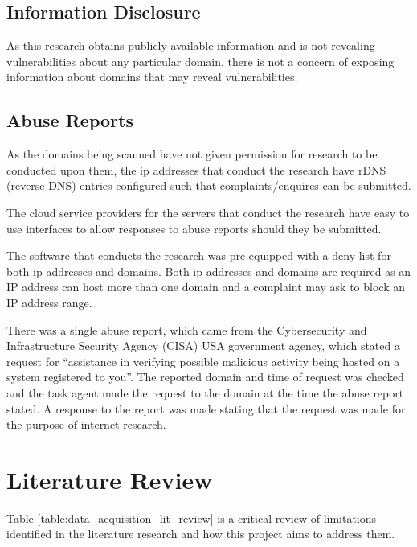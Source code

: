 \documentclass{mscreport}
\begin{document}
\subsection{Information Disclosure}

As this research obtains publicly available information and is not revealing vulnerabilities about any particular domain, there is not a concern of exposing information about domains that may reveal vulnerabilities.

\subsection{Abuse Reports}

As the domains being scanned have not given permission for research to be conducted upon them, the ip addresses that conduct the research have rDNS (reverse DNS) entries configured such that complaints/enquires can be submitted.

\vspace{0.3cm} \noindent
The cloud service providers for the servers that conduct the research have easy to use interfaces to allow responses to abuse reports should they be submitted.

\vspace{0.3cm} \noindent
The software that conducts the research was pre-equipped with a deny list for both ip addresses and domains. Both ip addresses and domains are required as an IP address can host more than one domain and a complaint may ask to block an IP address range.

\vspace{0.3cm} \noindent
There was a single abuse report, which came from the Cybersecurity and Infrastructure Security Agency (CISA) \cite{noauthor_undated-fh} USA government agency, which stated a request for ``assistance in verifying possible malicious activity being hosted on a system registered to you''. The reported domain and time of request was checked and the task agent made the request to the domain at the time the abuse report stated. A response to the report was made stating that the request was made for the purpose of internet research.

\newpage

\section{Literature Review}
\label{section:lit_review}

Table \ref{table:data_acquisition_lit_review} is a critical review of limitations identified in the literature research and how this project aims to address them.
\end{document}
